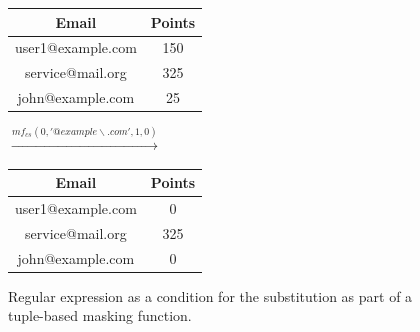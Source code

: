 \begin{figure}[ht]
    \begin{center}
    \footnotesize{
        \renewcommand{\arraystretch}{1.5}
        \begin{tabular}{|c|c|}
            \hline
            Email & Points \\
            \hline
            user1@example.com & 150 \\
            \hline
            service@mail.org & 325 \\
            \hline
            john@example.com & 25 \\
            \hline
        \end{tabular}
        \quad $\xrightarrow{mf_{cs}(0,'@example\backslash.com', 1, 0)}$ \quad
        \begin{tabular}{|c|c|}
            \hline
            Email & Points \\
            \hline
            user1@example.com & 0 \\
            \hline
            service@mail.org & 325 \\
            \hline
            john@example.com & 0 \\
            \hline
        \end{tabular}
    }
    \end{center}
    \caption{Regular expression as a condition for the substitution as part of a tuple-based masking function. \label{fig:condiSubRegex}}
\end{figure}

